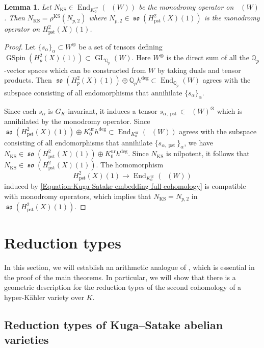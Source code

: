 \documentclass[12pt,reqno]{amsart}
\newtheorem{lem}[thm]{Lemma}
\theoremstyle{definition}
\newcommand{\Q}{{\mathds Q}}
\DeclareMathOperator{\Dpst}{\mathit{D}_{\mathrm{pst}}}
\newcommand\End{\mathop{\mathrm{End}}\nolimits}
\newcommand\GL{\mathop{\mathrm{GL}}\nolimits}
\newcommand\so{\mathop{\mathfrak{so}}\nolimits}
\newcommand\GSpin{\mathop{\mathrm{GSpin}}\nolimits}
\newcommand\KS{\mathop{\mathrm{KS}}\nolimits}
\DeclareMathOperator{\pst}{pst}
\DeclareMathOperator{\ur}{ur}
\numberwithin{equation}{section}
\begin{document}
\begin{lem}\label{Lemma:nilpotent operator on Kuga-Satake}
    Let $N_{\KS} \in \End_{K^{\ur}_0}(\Dpst(W))$
    be the monodromy operator on
$\Dpst(W)$.
Then
$
N_{\KS} = \rho^{\KS} (N_{p, 2})
$
where $N_{p,2} \in \so(H^2_{\pst}(X)(1))$ is the monodromy operator on $H^2_{\pst}(X)(1)$.
\end{lem}
\begin{proof}
Let $\{ s_{\alpha}\}_{\alpha}\subset W^{\otimes}$ be a set of tensors defining $\GSpin(H^2_p(X)(1)) \subset \GL_{\Q_p}(W)$.
Here $W^{\otimes}$ is the direct sum of all the $\Q_p$-vector spaces which can be constructed from $W$ by taking duals and tensor products.
Then
$\so(H^2_{p}(X)(1)) \oplus \Q_ph^{\deg} \subset \End_{\Q_p}(W)$
agrees with the subspace consisting of all endomorphisms that annihilate $\{ s_{\alpha}\}_\alpha$.

Since each $s_{\alpha}$ is $G_K$-invariant, it induces a tensor
$s_{\alpha, \pst} \in \Dpst(W)^\otimes$ which is annihilated by the monodromy operator.
Since
$\so(H^2_{\pst}(X)(1)) \oplus K^{\ur}_0h^{\deg} \subset \End_{K^{\ur}_0}(\Dpst(W))$
agrees with the subspace consisting of all endomorphisms that annihilate $\{ s_{\alpha, \pst}\}_\alpha$, we have
$
N_{\KS} \in \so(H^2_{\pst}(X)(1)) \oplus K^{\ur}_0h^{\deg}.
$
Since $N_{\KS}$ is nilpotent,
it follows that $N_{\KS} \in \so(H^2_{\pst}(X)(1))$.
The homomorphism
\[
H^2_{\pst}(X)(1) \to \End_{K^{\ur}_0}(\Dpst(W))
\]
induced by \eqref{Equation:Kuga-Satake embedding full cohomology} is compatible with monodromy operators, which implies that
$N_{\KS} =N_{p,2}$ in $\so(H^2_{\pst}(X)(1))$.
\end{proof}


\section{Reduction types}
\label{section: Reduction Types of Kuga--Satake}

In this section, we will establish an arithmetic analogue of \cite{SS20}, which is essential in the proof of the main theorems.
In particular, we will show that there is a geometric description for the reduction types of the second cohomology of a hyper-Kähler variety over $K$.


\subsection{Reduction types of Kuga--Satake abelian varieties}\label{subsec:Reduction of Kuga-Satake} 
\end{document}
